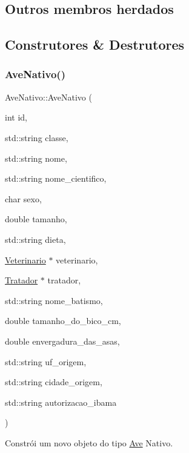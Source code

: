 \subsection*{Outros membros herdados}


\subsection{Construtores \& Destrutores}
\mbox{\label{classAveNativo_a5a51d97043dbf61f0c6ed91076242a42}} 
\subsubsection{\texorpdfstring{Ave\+Nativo()}{AveNativo()}\hspace{0.1cm}{\footnotesize\ttfamily [1/3]}}
{\footnotesize\ttfamily Ave\+Nativo\+::\+Ave\+Nativo (\begin{DoxyParamCaption}\item[{int}]{id,  }\item[{std\+::string}]{classe,  }\item[{std\+::string}]{nome,  }\item[{std\+::string}]{nome\+\_\+cientifico,  }\item[{char}]{sexo,  }\item[{double}]{tamanho,  }\item[{std\+::string}]{dieta,  }\item[{\hyperlink{classVeterinario}{Veterinario} $\ast$}]{veterinario,  }\item[{\hyperlink{classTratador}{Tratador} $\ast$}]{tratador,  }\item[{std\+::string}]{nome\+\_\+batismo,  }\item[{double}]{tamanho\+\_\+do\+\_\+bico\+\_\+cm,  }\item[{double}]{envergadura\+\_\+das\+\_\+asas,  }\item[{std\+::string}]{uf\+\_\+origem,  }\item[{std\+::string}]{cidade\+\_\+origem,  }\item[{std\+::string}]{autorizacao\+\_\+ibama }\end{DoxyParamCaption})}



Constrói um novo objeto do tipo \hyperlink{classAve}{Ave} Nativo. 


